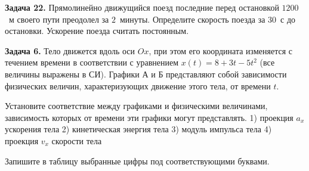 \begin{taskbasic}[code={\label{task:dem26_v17_n22}}]
\textbf{Задача 22.} Прямолинейно движущийся поезд последние перед остановкой $1200$~м своего пути преодолел за $2$~минуты. Определите скорость поезда за $30$~с до остановки. Ускорение поезда считать постоянным.

\end{taskbasic}



\begin{taskbasic}[code={\label{task:dem26_v19_n6}}]
\textbf{Задача 6.} Тело движется вдоль оси $Ox$, при этом его координата изменяется с течением времени в соответствии с уравнением $x(t)=8+3t-5t^{2}$ (все величины выражены в СИ). Графики А и Б представляют собой зависимости физических величин, характеризующих движение этого тела, от времени $t$.

\nopagebreak\smallskip
\begin{center}
\begin{minipage}[b]{0.45\linewidth}
\centering
{}
\end{minipage}
\begin{minipage}[b]{0.45\linewidth}
\centering
{}
\end{minipage}
\end{center}

Установите соответствие между графиками и физическими величинами, зависимость которых от времени эти графики могут представлять.
1) проекция $a_x$ ускорения тела
2) кинетическая энергия тела
3) модуль импульса тела
4) проекция $v_x$ скорости тела

Запишите в таблицу выбранные цифры под соответствующими буквами.

\end{taskbasic}


